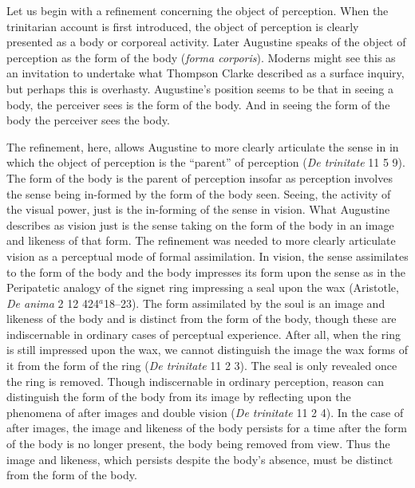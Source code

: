 \documentclass[12pt]{article}
\begin{document}
Let us begin with a refinement concerning the object of perception. When the trinitarian account is first introduced, the object of perception is clearly presented as a body or corporeal activity. Later Augustine speaks of the object of perception as the form of the body (\emph{forma corporis}). Moderns might see this as an invitation to undertake what Thompson Clarke described as a surface inquiry, but perhaps this is overhasty. Augustine's position seems to be that in seeing a body, the perceiver sees is the form of the body. And in seeing the form of the body the perceiver sees the body. 

The refinement, here, allows Augustine to more clearly articulate the sense in in which the object of perception is the ``parent'' of perception (\emph{De trinitate} 11 5 9). The form of the body is the parent of perception insofar as perception involves the sense being in-formed by the form of the body seen. Seeing, the activity of the visual power, just is the in-forming of the sense in vision. What Augustine describes as vision just is the sense taking on the form of the body in an image and likeness of that form. The refinement was needed to more clearly articulate vision as a perceptual mode of formal assimilation. In vision, the sense assimilates to the form of the body and the body impresses its form upon the sense as in the Peripatetic analogy of the signet ring impressing a seal upon the wax (Aristotle, \emph{De anima} 2 12 424\( ^{a} \)18–23). The form assimilated by the soul is an image and likeness of the body and is distinct from the form of the body, though these are indiscernable in ordinary cases of perceptual experience. After all, when the ring is still impressed upon the wax, we cannot distinguish the image the wax forms of it from the form of the ring (\emph{De trinitate} 11 2 3). The seal is only revealed once the ring is removed. Though indiscernable in ordinary perception, reason can distinguish the form of the body from its image by reflecting upon the phenomena of after images and double vision (\emph{De trinitate} 11 2 4). In the case of after images, the image and likeness of the body persists for a time after the form of the body is no longer present, the body being removed from view. Thus the image and likeness, which persists despite the body's absence, must be distinct from the form of the body.
\end{document}
